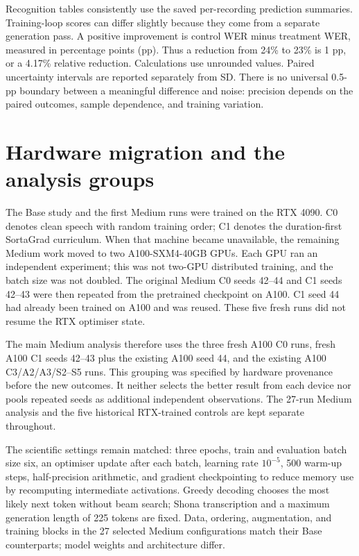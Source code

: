 \documentclass[12pt,a4paper]{report}
\begin{document}
Recognition tables consistently use the saved per-recording prediction summaries.
Training-loop scores can differ slightly because they come from a separate
generation pass. A positive improvement is control WER minus treatment WER,
measured in percentage points (pp). Thus a reduction from 24\% to 23\% is
1 pp, or a 4.17\% relative reduction. Calculations use unrounded values.
Paired uncertainty intervals are reported separately from SD. There is no
universal 0.5-pp boundary between a meaningful difference and noise: precision
depends on the paired outcomes, sample dependence, and training variation.

\section{Hardware migration and the analysis groups}
\label{sec:migration}

The Base study and the first Medium runs were trained on the RTX 4090.
C0 denotes clean speech with random training order; C1 denotes the
duration-first SortaGrad curriculum.
When that machine became unavailable, the remaining Medium work moved to two
A100-SXM4-40GB GPUs. Each GPU ran an independent experiment; this was not
two-GPU distributed training, and the batch size was not doubled. The original
Medium C0 seeds 42--44 and C1 seeds 42--43 were then repeated from the
pretrained checkpoint on A100. C1 seed 44 had already been trained on A100
and was reused. These five fresh runs did not resume the RTX optimiser state.

The main Medium analysis therefore uses the three fresh A100 C0 runs, fresh
A100 C1 seeds 42--43 plus the existing A100 seed 44, and the existing A100
C3/A2/A3/S2--S5 runs. This grouping was specified by hardware provenance
before the new outcomes. It neither selects the better result from each
device nor pools repeated seeds as additional independent observations.
The 27-run Medium analysis and the five historical RTX-trained controls are
kept separate throughout.

The scientific settings remain matched: three epochs, train and evaluation
batch size six, an optimiser update after each batch, learning rate $10^{-5}$,
500 warm-up steps, half-precision arithmetic, and gradient checkpointing
to reduce memory use by recomputing intermediate activations. Greedy decoding
chooses the most likely next token without beam search; Shona transcription
and a maximum generation length of 225 tokens are fixed. Data, ordering,
augmentation, and training blocks in the 27 selected Medium configurations
match their Base counterparts; model weights and architecture differ.
\end{document}
